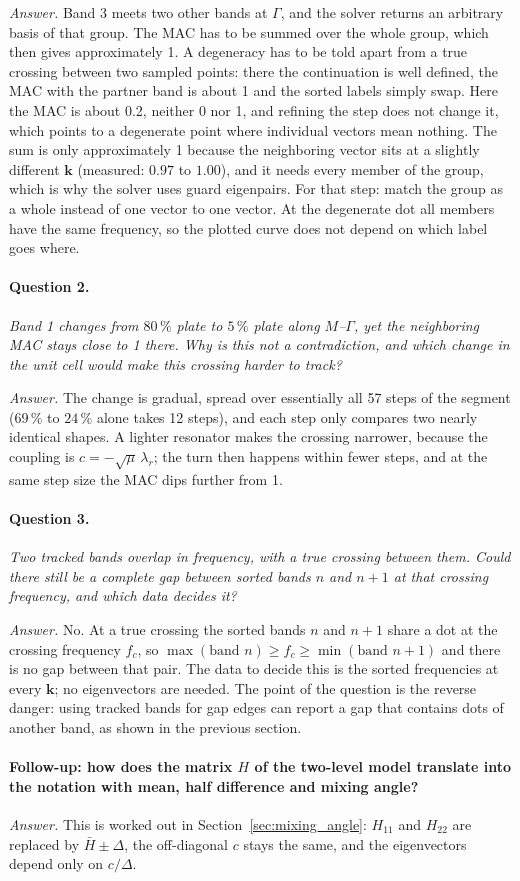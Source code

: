 \emph{Answer.} Band 3 meets two other bands at $\Gamma$, and the solver returns an
arbitrary basis of that group. The MAC has to be summed over the whole group, which
then gives approximately 1. A degeneracy has to be told apart from a true crossing
between two sampled points: there the continuation is well defined, the MAC with the
partner band is about 1 and the sorted labels simply swap. Here the MAC is about 0.2,
neither 0 nor 1, and refining the step does not change it, which points to a degenerate
point where individual vectors mean nothing. The sum is only approximately 1 because the
neighboring vector sits at a slightly different $\mathbf{k}$ (measured: $0.97$ to
$1.00$), and it needs every member of the group, which is why the solver uses guard
eigenpairs. For that step: match the group as a whole instead of one vector to one
vector. At the degenerate dot all members have the same frequency, so the plotted
curve does not depend on which label goes where.

\paragraph{Question 2.} \emph{Band 1 changes from $80\,\%$ plate to $5\,\%$ plate along
$M$--$\Gamma$, yet the neighboring MAC stays close to 1 there. Why is this not a
contradiction, and which change in the unit cell would make this crossing harder to
track?}

\emph{Answer.} The change is gradual, spread over essentially all 57 steps of the
segment ($69\,\%$ to $24\,\%$ alone takes 12 steps), and each step only compares two
nearly identical shapes. A lighter resonator makes the crossing narrower, because the
coupling is $c = -\sqrt{\mu}\,\lambda_r$; the turn then happens within fewer steps, and
at the same step size the MAC dips further from 1.

\paragraph{Question 3.} \emph{Two tracked bands overlap in frequency, with a true crossing
between them. Could there still be a complete gap between sorted bands $n$ and $n+1$ at
that crossing frequency, and which data decides it?}

\emph{Answer.} No. At a true crossing the sorted bands $n$ and $n+1$ share a dot at the
crossing frequency $f_c$, so $\max(\text{band } n) \ge f_c \ge \min(\text{band } n+1)$
and there is no gap between that pair. The data to decide this is the sorted frequencies
at every $\mathbf{k}$; no eigenvectors are needed. The point of the question is the
reverse danger: using tracked bands for gap edges can report a gap that contains dots of
another band, as shown in the previous section.

\paragraph{Follow-up: how does the matrix $H$ of the two-level model translate into the
notation with mean, half difference and mixing angle?}
\emph{Answer.} This is worked out in Section~\ref{sec:mixing_angle}: $H_{11}$ and
$H_{22}$ are replaced by $\bar{H} \pm \Delta$, the off-diagonal $c$ stays the same, and
the eigenvectors depend only on $c/\Delta$.
